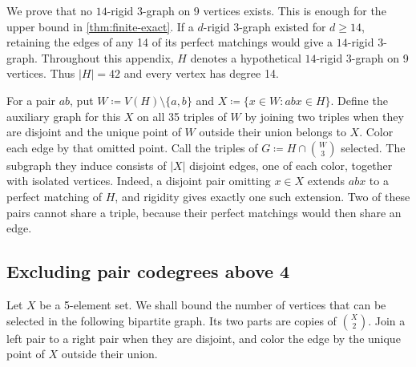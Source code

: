 \documentclass[10pt]{article}
\numberwithin{equation}{section}
\theoremstyle{definition}
\begin{document}
We prove that no $14$-rigid $3$-graph on 9 vertices exists. This is enough for the upper bound in \cref{thm:finite-exact}. If a $d$-rigid $3$-graph existed for $d\ge14$, retaining the edges of any 14 of its perfect matchings would give a $14$-rigid $3$-graph. Throughout this appendix, $H$ denotes a hypothetical $14$-rigid $3$-graph on 9 vertices. Thus $|H|=42$ and every vertex has degree 14.

For a pair $ab$, put $W\coloneqq V(H)\setminus\{a,b\}$ and $X\coloneqq\{x\in W\colon abx\in H\}$. Define the auxiliary graph for this $X$ on all 35 triples of $W$ by joining two triples when they are disjoint and the unique point of $W$ outside their union belongs to $X$. Color each edge by that omitted point. Call the triples of $G\coloneqq H\cap\binom W3$ selected. The subgraph they induce consists of $|X|$ disjoint edges, one of each color, together with isolated vertices. Indeed, a disjoint pair omitting $x\in X$ extends $abx$ to a perfect matching of $H$, and rigidity gives exactly one such extension. Two of these pairs cannot share a triple, because their perfect matchings would then share an edge.

\subsection{Excluding pair codegrees above 4}

Let $X$ be a 5-element set. We shall bound the number of vertices that can be selected in the following bipartite graph. Its two parts are copies of $\binom X2$. Join a left pair to a right pair when they are disjoint, and color the edge by the unique point of $X$ outside their union.
\end{document}
